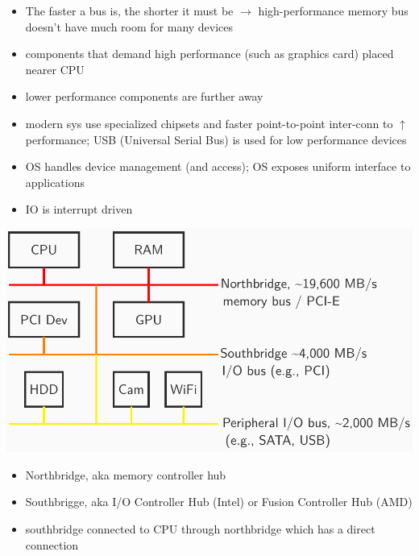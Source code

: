 \begin{minipage}{.5\linewidth}
  \flushleft
  \begin{itemize}
  \item The faster a bus is, the shorter it must be $\to$ high-performance memory bus doesn't have much room for many devices
  \item components that demand high performance (such as graphics card) placed nearer CPU
  \item lower performance components are further away
  \end{itemize}
\end{minipage}
\begin{minipage}{.5\linewidth}
  \flushleft
  \begin{itemize}
  \item modern sys use specialized chipsets and faster point-to-point inter-conn to $\uparrow$ performance; USB (Universal Serial Bus) is used for low performance devices
  \item OS handles device management (and access); OS exposes uniform interface to applications
  \item IO is interrupt driven
  \end{itemize}
\end{minipage}
\begin{minipage}{.65\linewidth}
\includegraphics[width=\linewidth]{imgs/otherio}
\end{minipage}
\begin{minipage}{.35\linewidth}
  \flushleft
  \begin{itemize}
  \item Northbridge, aka memory controller hub
  \item Southbrigge, aka I/O Controller Hub (Intel) or Fusion Controller Hub (AMD)
  \item southbridge connected to CPU through northbridge which has a direct connection
  \end{itemize}
\end{minipage}
